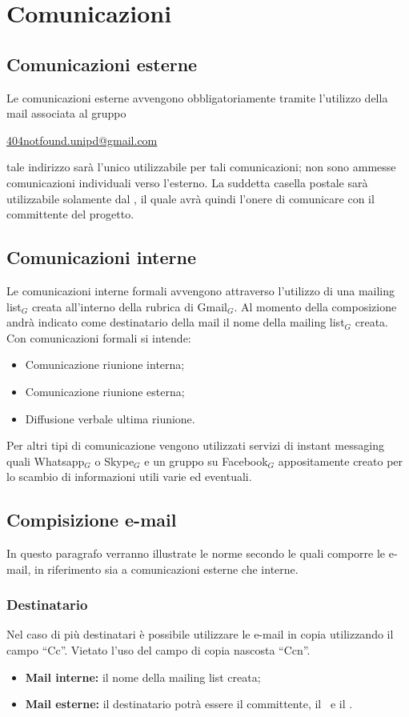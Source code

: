 \section{Comunicazioni}
\subsection{Comunicazioni esterne}
Le comunicazioni esterne avvengono obbligatoriamente tramite l’utilizzo della mail associata al gruppo
\begin{center} \href{mailto:404notfound.unipd@gmail.com}{404notfound.unipd@gmail.com}
\end{center}
tale indirizzo sarà l’unico utilizzabile per tali comunicazioni; non sono ammesse comunicazioni individuali verso l’esterno.
La suddetta casella postale sarà utilizzabile solamente dal \ruoloResponsabile, il quale avrà quindi l’onere di comunicare con il committente del progetto.

\subsection{Comunicazioni interne}
Le comunicazioni interne formali avvengono attraverso l’utilizzo di una mailing list$_{G}$ creata all'interno della rubrica di Gmail$_{G}$. Al momento della composizione andrà indicato come destinatario della mail il nome della mailing list$_{G}$ creata.
Con comunicazioni formali si intende:
\begin{itemize}
	\item Comunicazione riunione interna;
	\item Comunicazione riunione esterna;
	\item Diffusione verbale ultima riunione.
\end{itemize}

Per altri tipi di comunicazione vengono utilizzati servizi di instant messaging quali Whatsapp$_{G}$ o Skype$_{G}$ e un gruppo su Facebook$_{G}$ appositamente creato per lo scambio di informazioni utili varie ed eventuali.

\subsection{Compisizione e-mail}
In questo paragrafo verranno illustrate le norme secondo le quali comporre le e-mail, in riferimento sia a comunicazioni esterne che interne.

\subsubsection{Destinatario}
Nel caso di più destinatari è possibile utilizzare le e-mail in copia utilizzando il campo ``Cc''. Vietato l'uso del campo di copia nascosta ``Ccn''.
\begin{itemize}
	\item \textbf{Mail interne:} il nome della mailing list creata;
	\item \textbf{Mail esterne:} il destinatario potrà essere il committente, il \Vardanega\ e il \Cardin.
\end{itemize}

